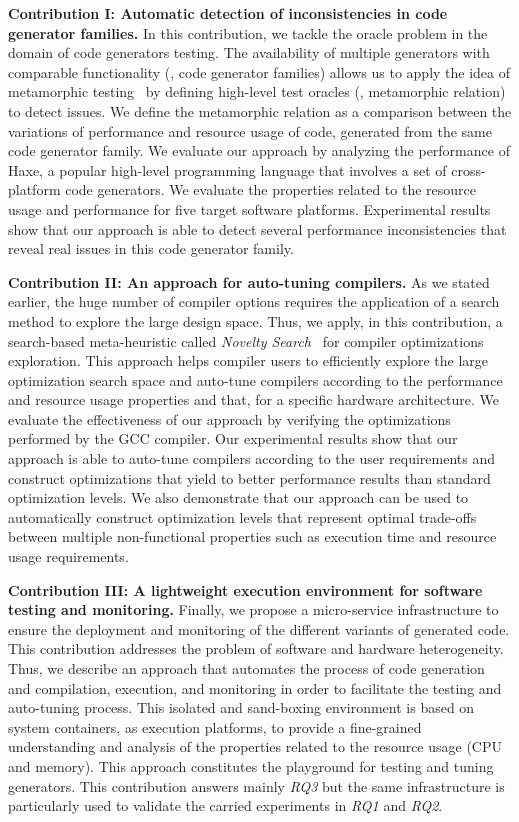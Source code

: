 \textbf{Contribution I: Automatic detection of inconsistencies in code generator families.}
In this contribution, we tackle the oracle problem in the domain of code generators testing.
The availability of multiple generators with comparable functionality (\ie, code generator families) allows us to apply the idea of metamorphic testing~\cite{zhou2004metamorphic} by defining high-level test oracles (\ie, metamorphic relation) to detect issues. We define the metamorphic relation as a comparison between the variations of performance and resource usage of code, generated from the same code generator family.
We evaluate our approach by analyzing the performance of Haxe, a popular high-level programming language that involves a set of cross-platform code generators. We evaluate the properties related to the resource usage and performance for five target software platforms. Experimental results show that our approach is able to detect several performance inconsistencies that reveal real issues in this code generator family. 

\textbf{Contribution II: An approach for auto-tuning compilers.}
As we stated earlier, the huge number of compiler options requires the application of a search method to explore the large design space. Thus, we apply, in this contribution, a search-based meta-heuristic called \textit{Novelty Search}~\cite{lehman2008exploiting} for compiler optimizations exploration. This approach helps compiler users to efficiently explore the large optimization search space and auto-tune compilers according to the performance and resource usage properties and that, for a specific hardware architecture. 
We evaluate the effectiveness of our approach by verifying the optimizations performed by the GCC compiler.
Our experimental results show that our approach is able to auto-tune compilers according to the user requirements and construct optimizations that yield to better performance results than standard optimization levels. We also demonstrate that our approach can be used to automatically construct optimization levels that represent optimal trade-offs between multiple non-functional properties such as execution time and resource usage requirements.

\textbf{Contribution III: A lightweight execution environment for software testing and monitoring.}
Finally, we propose a micro-service infrastructure to ensure the deployment and monitoring of the different variants of generated code. This contribution addresses the problem of software and hardware heterogeneity. Thus, we describe an approach that automates the process of code generation and compilation, execution, and monitoring in order to facilitate the testing and auto-tuning process.
This isolated and sand-boxing environment is based on system containers, as execution platforms, to provide a fine-grained understanding and analysis of the properties related to the resource usage (CPU and memory). 
This approach constitutes the playground for testing and tuning generators. This contribution answers mainly \textit{RQ3} but the same infrastructure is particularly used to validate the carried experiments in \textit{RQ1} and \textit{RQ2}.

